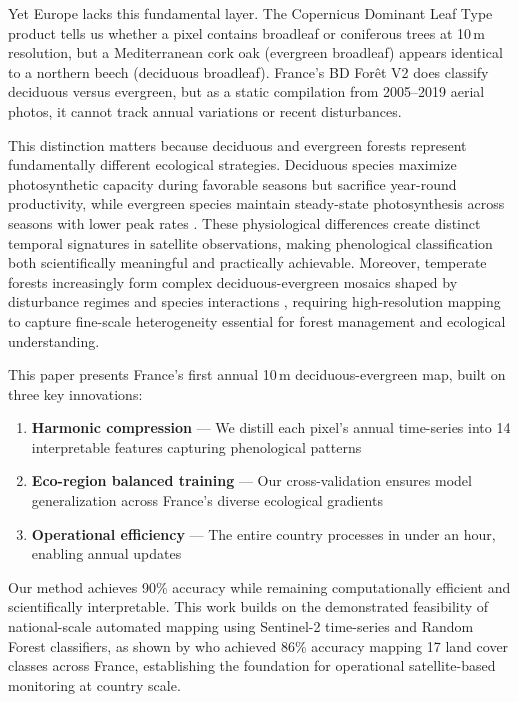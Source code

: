 \documentclass[utf8]{FrontiersinHarvard}
\begin{document}
Yet Europe lacks this fundamental layer. The Copernicus Dominant Leaf Type product \citep{EU2024a} tells us whether a pixel contains broadleaf or coniferous trees at 10\,m resolution, but a Mediterranean cork oak (evergreen broadleaf) appears identical to a northern beech (deciduous broadleaf). France's BD Forêt V2 \citep{IGN2024} does classify deciduous versus evergreen, but as a static compilation from 2005–2019 aerial photos, it cannot track annual variations or recent disturbances.

This distinction matters because deciduous and evergreen forests represent fundamentally different ecological strategies. Deciduous species maximize photosynthetic capacity during favorable seasons but sacrifice year-round productivity, while evergreen species maintain steady-state photosynthesis across seasons with lower peak rates \citep{JarvisLeverenz1983}. These physiological differences create distinct temporal signatures in satellite observations, making phenological classification both scientifically meaningful and practically achievable. Moreover, temperate forests increasingly form complex deciduous-evergreen mosaics shaped by disturbance regimes and species interactions \citep{Frelich2002}, requiring high-resolution mapping to capture fine-scale heterogeneity essential for forest management and ecological understanding.

This paper presents France's first annual 10\,m deciduous-evergreen map, built on three key innovations:
\begin{enumerate}
    \item \textbf{Harmonic compression} — We distill each pixel's annual time-series into 14 interpretable features capturing phenological patterns
    \item \textbf{Eco-region balanced training} — Our cross-validation ensures model generalization across France's diverse ecological gradients
    \item \textbf{Operational efficiency} — The entire country processes in under an hour, enabling annual updates
\end{enumerate}

Our method achieves 90\% accuracy while remaining computationally efficient and scientifically interpretable. This work builds on the demonstrated feasibility of national-scale automated mapping using Sentinel-2 time-series and Random Forest classifiers, as shown by \citet{Inglada2017} who achieved 86\% accuracy mapping 17 land cover classes across France, establishing the foundation for operational satellite-based monitoring at country scale.
\end{document}
